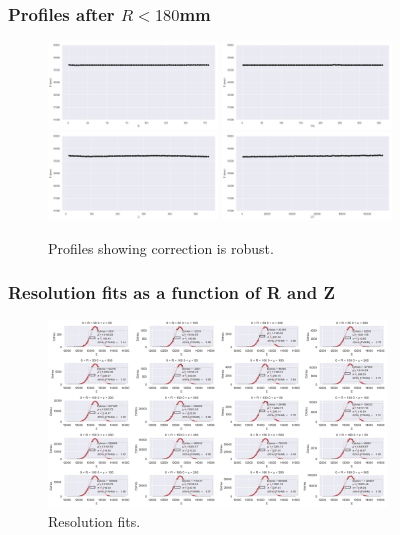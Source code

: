 \begin{frame}
\frametitle{Profiles after $R < 180$mm}
\begin{figure}
  \begin{center}
      \includegraphics[width=0.4\textwidth]{img/r6581/RProfileC.png}
      \includegraphics[width=0.4\textwidth]{img/r6581/PhiProfile.png} \\
      \includegraphics[width=0.4\textwidth]{img/r6581/ZProfile.png}
      \includegraphics[width=0.4\textwidth]{img/r6581/TProfile.png}
    \caption{Profiles showing correction is robust.}
  \end{center}
\end{figure}
\end{frame}

\begin{frame}
\frametitle{Resolution fits as a function of R and Z}
\begin{figure}
  \begin{center}
      \includegraphics[width=0.8\textwidth]{img/r6581/ResoFit.png}
    \caption{Resolution fits.}
  \end{center}
\end{figure}
\end{frame}

